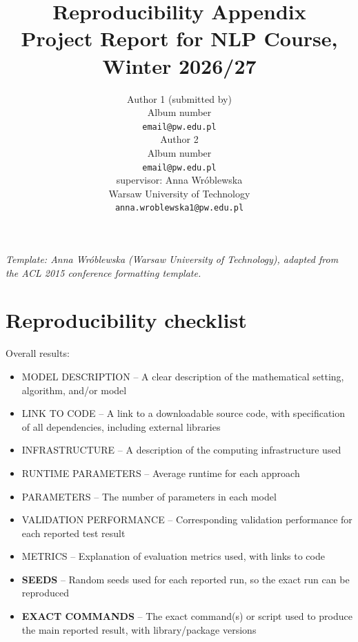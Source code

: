 \documentclass[11pt]{article}
\title{Reproducibility Appendix\\Project Report for NLP Course, Winter 2026/27}
\author{Author 1 (submitted by) \\
  Album number \\
  {\tt email@pw.edu.pl} \\
  \And
  Author 2 \\
  Album number \\
  {\tt email@pw.edu.pl} \\
  \AND
  supervisor: Anna Wróblewska\\
  Warsaw University of Technology \\
  {\tt anna.wroblewska1@pw.edu.pl}
  }
\date{}
\begin{document}
\maketitle

{\small\em Template: Anna Wr\'oblewska (Warsaw University of Technology), adapted from the ACL 2015 conference formatting template.}
\vspace{4pt}


\section*{Reproducibility checklist}


Overall results:
\begin{itemize}
    \item MODEL DESCRIPTION -- A clear description of the mathematical setting, algorithm, and/or model
    \item LINK TO CODE -- A link to a downloadable source code, with specification of all dependencies, including external libraries
    \item INFRASTRUCTURE -- A description of the computing infrastructure used
    \item RUNTIME PARAMETERS -- Average runtime for each approach
    \item PARAMETERS -- The number of parameters in each model
    \item VALIDATION PERFORMANCE -- Corresponding validation performance for each reported test result
    \item METRICS -- Explanation of evaluation metrics used, with links to code
    \item \textbf{SEEDS} -- Random seeds used for each reported run, so the exact run can be reproduced
    \item \textbf{EXACT COMMANDS} -- The exact command(s) or script used to produce the main reported result, with library/package versions
\end{itemize}
\end{document}
